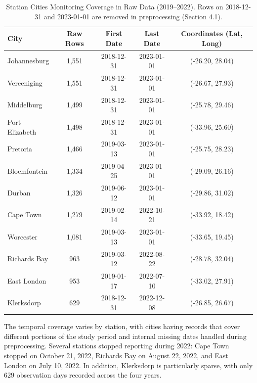 \begin{table}[htbp]
\centering
\small
\renewcommand{\arraystretch}{0.92}
\caption{Station Cities Monitoring Coverage in Raw Data (2019--2022). Rows on 2018-12-31 and 2023-01-01 are removed in preprocessing (Section 4.1).}
\label{tab:city_coverage}
\begin{tabular}{lcccc}
\toprule
\textbf{City} & \textbf{Raw Rows} & \textbf{First Date} & \textbf{Last Date} & \textbf{Coordinates (Lat, Long)} \\ \midrule
Johannesburg & 1,551 & 2018-12-31 & 2023-01-01 & (-26.20, 28.04) \\
Vereeniging & 1,551 & 2018-12-31 & 2023-01-01 & (-26.67, 27.93) \\
Middelburg & 1,499 & 2018-12-31 & 2023-01-01 & (-25.78, 29.46) \\
Port Elizabeth & 1,498 & 2018-12-31 & 2023-01-01 & (-33.96, 25.60) \\
Pretoria & 1,466 & 2019-03-13 & 2023-01-01 & (-25.75, 28.23) \\
Bloemfontein & 1,334 & 2019-04-25 & 2023-01-01 & (-29.09, 26.16) \\
Durban & 1,326 & 2019-06-12 & 2023-01-01 & (-29.86, 31.02) \\
Cape Town & 1,279 & 2019-02-14 & 2022-10-21 & (-33.92, 18.42) \\
Worcester & 1,081 & 2019-03-13 & 2023-01-01 & (-33.65, 19.45) \\
Richards Bay & 963 & 2019-03-12 & 2022-08-22 & (-28.78, 32.04) \\
East London & 953 & 2019-01-17 & 2022-07-10 & (-33.02, 27.91) \\
Klerksdorp & 629 & 2018-12-31 & 2022-12-08 & (-26.85, 26.67) \\ \bottomrule
\end{tabular}
\end{table}

The temporal coverage varies by station, with cities having records that cover different portions of the study period and internal missing dates handled during preprocessing. Several stations stopped reporting during 2022: Cape Town stopped on October 21, 2022, Richards Bay on August 22, 2022, and East London on July 10, 2022. In addition, Klerksdorp is particularly sparse, with only 629 observation days recorded across the four years.
